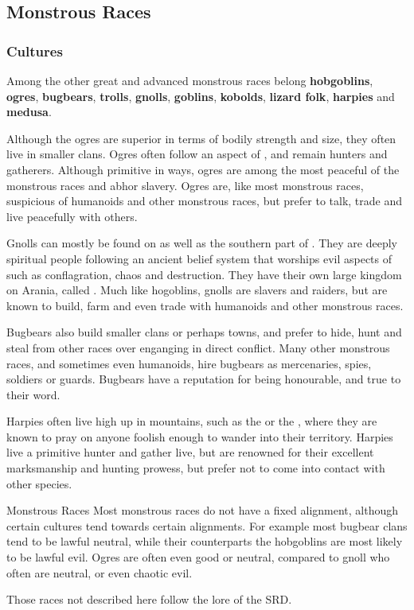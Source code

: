 \subsection{Monstrous Races}
\label{sec:Monstrous Races}

\subsubsection{Cultures}

Among the other great and advanced monstrous races belong \textbf{hobgoblins},
\textbf{ogres}, \textbf{bugbears}, \textbf{trolls}, \textbf{gnolls},
\textbf{goblins}, \textbf{kobolds}, \textbf{lizard folk}, \textbf{harpies}
and \textbf{medusa}.

Although the ogres are superior in terms of bodily strength and size, they
often live in smaller clans. Ogres often follow an aspect of
, and remain hunters and gatherers. Although primitive
in ways, ogres are among the most peaceful of the monstrous races and abhor
slavery. Ogres are, like most monstrous races, suspicious of humanoids and
other monstrous races, but prefer to talk, trade and live peacefully with
others.

Gnolls can mostly be found on  as well as the southern
part of . They are deeply spiritual people following an
ancient belief system that worships evil aspects of  such
as conflagration, chaos and destruction. They have their own large kingdom on
Arania, called . Much like hogoblins, gnolls are slavers
and raiders, but are known to build, farm and even trade with humanoids and
other monstrous races.

Bugbears also build smaller clans or perhaps towns, and prefer to hide, hunt
and steal from other races over enganging in direct conflict. Many other
monstrous races, and sometimes even humanoids, hire bugbears as mercenaries,
spies, soldiers or guards. Bugbears have a reputation for being honourable,
and true to their word.

Harpies often live high up in mountains, such as the 
or the , where they are known to pray on anyone
foolish enough to wander into their territory. Harpies live a primitive hunter
and gather live, but are renowned for their excellent marksmanship and hunting
prowess, but prefer not to come into contact with other species.

\begin{35e}{Monstrous Races}
  Most monstrous races do not have a fixed alignment, although certain
  cultures tend towards certain alignments. For example most bugbear clans
  tend to be lawful neutral, while their counterparts the hobgoblins are most
  likely to be lawful evil. Ogres are often even good or neutral, compared to
  gnoll who often are neutral, or even chaotic evil.

  Those races not described here follow the lore of the SRD.
\end{35e}
